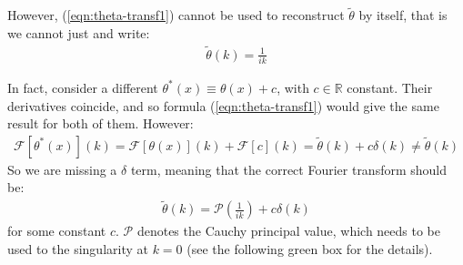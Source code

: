 \documentclass[../template.tex]{subfiles}
\begin{document}
However, (\ref{eqn:theta-transf1}) cannot be used to reconstruct $\tilde{\theta}$ by itself, that is we cannot just  and write:
\begin{align} \label{eqn:wrong-theta-transform}
    \tilde{\theta}(k) = \frac{1}{ik} 
\end{align}

In fact, consider a different $\theta^*(x) \equiv \theta(x) + c$, with $c \in \mathbb{R}$ constant. Their derivatives coincide, and so formula (\ref{eqn:theta-transf1}) would give the same result for both of them. However:
\begin{align*}
    \mathcal{F}[\theta^*(x)](k) = \mathcal{F}[\theta(x)](k) + \mathcal{F}[c](k) = \tilde{\theta}(k) + c \delta(k) \neq \tilde{\theta}(k)
\end{align*}
So we are missing a $\delta$ term, meaning that the correct Fourier transform should be:
\begin{align}\label{eqn:full-theta-tilda}
    \tilde{\theta}(k) = \mathcal{P}\left(\frac{1}{ik} \right) + c \delta(k)
\end{align}
for some constant $c$. $\mathcal{P}$ denotes the Cauchy principal value, which needs to be used to  the singularity at $k=0$ (see the following green box for the details).
\end{document}
